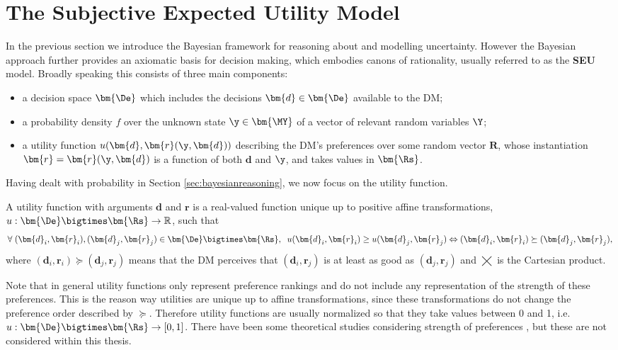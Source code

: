 \section{The Subjective Expected Utility Model}
\label{sec:SEU}
In the previous section we introduce the Bayesian framework for reasoning about and modelling uncertainty. However the Bayesian approach further provides an axiomatic basis for decision making, which embodies canons of rationality, usually referred to as the \textbf{\gls{SEU}} model. Broadly speaking this consists of three main components:
\begin{itemize}
\item a decision space $\bm{\De}$ which includes the decisions $\bm{d}\in\bm{\De}$ available to the \gls{DM};
\item a probability density $f$ over the unknown state $\y\in \bm{\MY}$ of a vector of relevant random variables $\Y$;
\item a utility function $u(\bm{d},\bm{r}(\y,\bm{d}))$ describing the \gls{DM}'s preferences over some random vector $\bm{R}$, whose instantiation $\bm{r}=\bm{r}(\y,\bm{d})$ is a function of both $\bm{d}$ and $\y$, and takes values in $\bm{\Rs}$.
\end{itemize}

Having dealt with probability in Section \ref{sec:bayesianreasoning}, we now focus on the utility function.
\begin{definition}
\label{def:ut}
A utility function with arguments $\bm{d}$ and $\bm{r}$ is a real-valued function unique up to positive affine transformations, $u:\bm{\De}\bigtimes\bm{\Rs}\rightarrow \mathbb{R}$, such that 
\begin{equation*}
\label{eq:utility}
\forall \; (\bm{d}_i,\bm{r}_i), (\bm{d}_j,\bm{r}_j)\in \bm{\De}\bigtimes\bm{\Rs},\;\; u(\bm{d}_i,\bm{r}_i)\geq u(\bm{d}_j,\bm{r}_j) \Leftrightarrow (\bm{d}_i,\bm{r}_i) \succeq (\bm{d}_j,\bm{r}_j),
\end{equation*}
where  $(\bm{d}_i,\bm{r}_i) \succeq (\bm{d}_j,\bm{r}_j)$ means that the \gls{DM} perceives that $(\bm{d}_i,\bm{r}_j)$ is at least as good as $(\bm{d}_j,\bm{r}_j)$ and $\bigtimes$ is the Cartesian product.
\end{definition}
Note that in general utility functions only represent preference rankings and do not include any representation of the strength of these preferences. This is the reason way utilities are unique up to affine transformations, since these transformations do not change the preference order described by $\succeq$. Therefore utility functions are usually normalized so that they take values between 0 and 1, i.e. $u:\bm{\De}\bigtimes\bm{\Rs}\rightarrow [0,1]$. There have been some theoretical studies considering strength of preferences \citep[see e.g.][]{Argyris2014}, but these are not considered within this thesis. 

